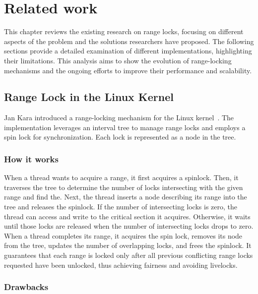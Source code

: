 
\chapter{Related work}\label{chapter:relatedwork}

This chapter reviews the existing research on range locks, focusing on different aspects of the problem and the solutions researchers have proposed. 
The following sections provide a detailed examination of different implementations, highlighting their limitations. 
This analysis aims to show the evolution of range-locking mechanisms and the ongoing efforts to improve their performance and scalability.

\section{Range Lock in the Linux Kernel}

Jan Kara introduced a range-locking mechanism for the Linux kernel~\parencite{linuxRangeLockImpl2013}. 
The implementation leverages an interval tree to manage range locks and employs a spin lock for synchronization. 
Each lock is represented as a node in the tree.

\subsection*{How it works}

When a thread wants to acquire a range, it first acquires a spinlock. 
Then, it traverses the tree to determine the number of locks intersecting with the given range and find the. 
Next, the thread inserts a node describing its range into the tree and releases the spinlock. 
If the number of intersecting locks is zero, the thread can access and write to the critical section it acquires. 
Otherwise, it waits until those locks are released when the number of intersecting locks drops to zero. 
When a thread completes its range, it acquires the spin lock, removes its node from the tree, updates the number of overlapping locks, and frees the spinlock. 
It guarantees that each range is locked only after all previous conflicting range locks requested have been unlocked, thus achieving fairness and avoiding livelocks.
    
\subsection*{Drawbacks}

